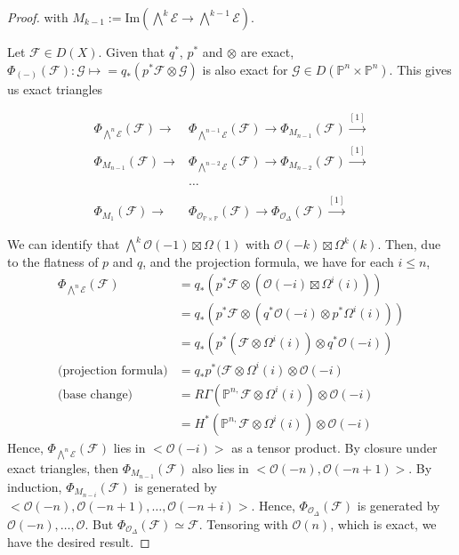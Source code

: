\begin{proof}
    
    with $M_{k-1}:= \text{Im} (\bigwedge^{k}\mathcal{E} \to \bigwedge^{k-1}\mathcal{E})$.  
    
    Let $\mathcal{F} \in D(X)$. Given that $q^*$, $p^*$ and $\otimes$ are exact, $\Phi_{(-)}  (\mathcal{F}): \mathcal{G} \mapsto =q_{*}(p^{*}\mathcal{F} \otimes \mathcal{G})$ is also exact for $\mathcal{G} \in D(\mathbb{P}^{n}\times \mathbb{P}^n)$. This gives us exact triangles
    
    \begin{align*}
     \Phi_{\bigwedge^{n}\mathcal{E}} (\mathcal{F}) \to &\Phi_{\bigwedge^{n-1}\mathcal{E}} (\mathcal{F})\to \Phi_{M_{n-1}}(\mathcal{F})\xrightarrow{[1]}   \\
    \Phi_{M_{n-1}}(\mathcal{F})\to & \Phi_{\bigwedge^{n-2}\mathcal{E}} (\mathcal{F})\to \Phi_{M_{n-2}}(\mathcal{F})\xrightarrow{[1]}  \\  \\
    &\dots \\  \\
     \Phi_{M_{1}}(\mathcal{F})\to &\Phi_{\mathcal{O}_{\mathbb{P}\times \mathbb{P}} }(\mathcal{F})\to \Phi_{\mathcal{O}_{\Delta}} (\mathcal{F})\xrightarrow{[1]}
    \end{align*}
    
    We can identify that $\bigwedge^{k}\mathcal{O}(-1)\boxtimes\Omega(1)$ with $\mathcal{O}(-k)\boxtimes\Omega^k(k)$. Then, due to the flatness of $p$ and $q$, and the projection formula, we have for each $i \leq n$, \begin{align*}
     \Phi_{\bigwedge^{n}\mathcal{E}} (\mathcal{F}) &= q_{*}(p^{*}\mathcal{F }\otimes  (\mathcal{O}(-i)\boxtimes \Omega^i(i))) \\
    &= q_{*}(p^{*}\mathcal{F }\otimes  (q^{*}\mathcal{O}(-i)\otimes  p^{*}\Omega^i(i))) \\
    &= q_{*}(p^{*}(\mathcal{F}\otimes \Omega^{i}(i)) \otimes  q^{*}\mathcal{O}(-i)) \\
    \text{(projection formula)} &=q_{*}p^{*}(\mathcal{F}\otimes \Omega^{i}(i) \otimes  \mathcal{O}(-i)\\
    \text{(base change)} &= R\Gamma(\mathbb{P}^{n,}\mathcal{F}\otimes \Omega^{i}(i))\otimes \mathcal{O}(-i) \\
    &= H^{*}(\mathbb{P}^{n,}\mathcal{F}\otimes \Omega^{i}(i)) \otimes \mathcal{O}(-i)  
    \end{align*}
    Hence,  $\Phi_{\bigwedge^{n}\mathcal{E}} (\mathcal{F})$ lies in $<\mathcal{O}(-i)>$ as a tensor product. By closure under exact triangles, then $\Phi_{M_{n-1}}(\mathcal{F})$ also lies in $<\mathcal{O}(-n), \mathcal{O}(-n+1)>$. By induction, $\Phi_{M_{n-i}}(\mathcal{F})$ is generated by $<\mathcal{O}(-n),\mathcal{O}(-n+1),\dots,\mathcal{O}(-n+i)>$. Hence, $\Phi_{\mathcal{O}_\Delta}(\mathcal{F})$ is generated by $\mathcal{O}(-n),\dots,\mathcal{O}$. But $\Phi_{\mathcal{O}_\Delta}(\mathcal{F}) \simeq \mathcal{ F}$.  Tensoring with $\mathcal{O}(n)$, which is exact, we have the desired result. 
    
    
    \end{proof}

